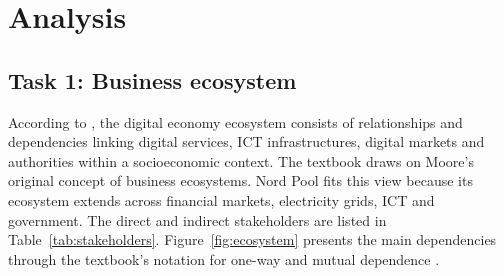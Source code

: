 \section{Analysis}
\label{sec:analysis}

\subsection{Task 1: Business ecosystem}
\label{sec:t1}

According to \citet[Def.~4.1]{OverbyAudestad2021}, the digital economy ecosystem consists of relationships and dependencies linking digital services, ICT infrastructures, digital markets and authorities within a socioeconomic context. The textbook draws on Moore's original concept of business ecosystems. Nord Pool fits this view because its ecosystem extends across financial markets, electricity grids, ICT and government. The direct and indirect stakeholders are listed in Table~\ref{tab:stakeholders}. Figure~\ref{fig:ecosystem} presents the main dependencies through the textbook's notation for one-way and mutual dependence \citep[Figure~4.3]{OverbyAudestad2021}.

